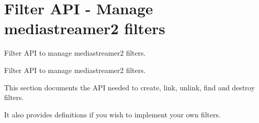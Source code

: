 \section{Filter A\+PI -\/ Manage mediastreamer2 filters}
\label{group__mediastreamer2__filter}


Filter A\+PI to manage mediastreamer2 filters.  


Filter A\+PI to manage mediastreamer2 filters. 

This section documents the A\+PI needed to create, link, unlink, find and destroy filters.

It also provides definitions if you wish to implement your own filters. 